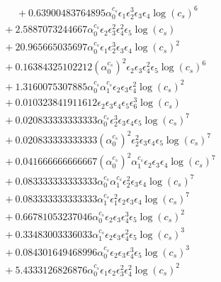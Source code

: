 \documentclass[10pt]{article}
\begin{document}
\begin{align*}
\phantom{F_{s,7}} &\phantom{={}}{}  + 0.63900483764895 \alpha_{0}^{c_s} \epsilon_{1} \epsilon_{2}^{3} \epsilon_{3} \epsilon_{4} \log{\left(c_{s} \right)}^{6} \\
&{}  + 2.5887073244667 \alpha_{0}^{c_s} \epsilon_{2} \epsilon_{3}^{2} \epsilon_{4}^{2} \epsilon_{5} \log{\left(c_{s} \right)} \\
&{}  + 20.965665035697 \alpha_{0}^{c_s} \epsilon_{1} \epsilon_{2}^{3} \epsilon_{3} \epsilon_{4} \log{\left(c_{s} \right)}^{2} \\
&{}  + 0.16384325102212 \left(\alpha_{0}^{c_s}\right)^{2} \epsilon_{2} \epsilon_{3} \epsilon_{4}^{2} \epsilon_{5} \log{\left(c_{s} \right)}^{6} \\
&{}  + 1.3160075307885 \alpha_{0}^{c_s} \alpha_{1}^{c_s} \epsilon_{2} \epsilon_{3} \epsilon_{4}^{2} \log{\left(c_{s} \right)}^{2} \\
&{}  + 0.010323841911612 \epsilon_{2} \epsilon_{3} \epsilon_{4} \epsilon_{5} \epsilon_{6}^{3} \log{\left(c_{s} \right)} \\
&{}  + 0.020833333333333 \alpha_{0}^{c_s} \epsilon_{2}^{3} \epsilon_{3} \epsilon_{4} \epsilon_{5} \log{\left(c_{s} \right)}^{7} \\
&{}  + 0.020833333333333 \left(\alpha_{0}^{c_s}\right)^{2} \epsilon_{2}^{2} \epsilon_{3} \epsilon_{4} \epsilon_{5} \log{\left(c_{s} \right)}^{7} \\
&{}  + 0.041666666666667 \left(\alpha_{0}^{c_s}\right)^{2} \alpha_{1}^{c_s} \epsilon_{2} \epsilon_{3} \epsilon_{4} \log{\left(c_{s} \right)}^{7} \\
&{}  + 0.083333333333333 \alpha_{0}^{c_s} \alpha_{1}^{c_s} \epsilon_{2}^{2} \epsilon_{3} \epsilon_{4} \log{\left(c_{s} \right)}^{7} \\
&{}  + 0.083333333333333 \alpha_{1}^{c_s} \epsilon_{1}^{2} \epsilon_{2} \epsilon_{3} \epsilon_{4} \log{\left(c_{s} \right)}^{7} \\
&{}  + 0.66781053237046 \alpha_{0}^{c_s} \epsilon_{2} \epsilon_{3} \epsilon_{4}^{3} \epsilon_{5} \log{\left(c_{s} \right)}^{2} \\
&{}  + 0.33483003336033 \alpha_{1}^{c_s} \epsilon_{2} \epsilon_{3} \epsilon_{4}^{2} \epsilon_{5} \log{\left(c_{s} \right)}^{3} \\
&{}  + 0.084301649468996 \alpha_{0}^{c_s} \epsilon_{2} \epsilon_{3} \epsilon_{4}^{3} \epsilon_{5} \log{\left(c_{s} \right)}^{3} \\
&{}  + 5.4333126826876 \alpha_{0}^{c_s} \epsilon_{1} \epsilon_{2} \epsilon_{3}^{2} \epsilon_{4}^{2} \log{\left(c_{s} \right)}^{2} \\

\end{align*}
\end{document}
